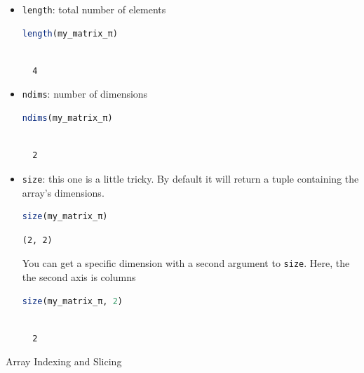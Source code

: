 \documentclass[
  notoc %
]{tufte-book}
\makeatletter
\newcommand{\passthrough}[1]{#1}
\renewcommand\subsubsection{%
\@startsection{subsubsection}{3}{\z@ }{-3.25ex\@plus -1ex \@minus -.2ex}{1.5ex \@plus .2ex}{\normalfont \normalsize \bfseries }
}
\makeatother
\begin{document}
\begin{itemize}
\item
  \passthrough{\lstinline!length!}: total number of elements

  \begin{lstlisting}[language=Julia]
  length(my_matrix_π)
  \end{lstlisting}

  \begin{lstlisting}[language=Output]

  4

  \end{lstlisting}
\item
  \passthrough{\lstinline!ndims!}: number of dimensions

  \begin{lstlisting}[language=Julia]
  ndims(my_matrix_π)
  \end{lstlisting}

  \begin{lstlisting}[language=Output]

  2

  \end{lstlisting}
\item
  \passthrough{\lstinline!size!}: this one is a little tricky. By
  default it will return a tuple containing the array's dimensions.

  \begin{lstlisting}[language=Julia]
  size(my_matrix_π)
  \end{lstlisting}

  \begin{lstlisting}[language=Output]
  (2, 2)
  \end{lstlisting}

  You can get a specific dimension with a second argument to
  \passthrough{\lstinline!size!}. Here, the the second axis is columns

  \begin{lstlisting}[language=Julia]
  size(my_matrix_π, 2)
  \end{lstlisting}

  \begin{lstlisting}[language=Output]

  2

  \end{lstlisting}
\end{itemize}

\hypertarget{sec:array_indexing}{%
\subsubsection{Array Indexing and Slicing}\label{sec:array_indexing}}
\end{document}
